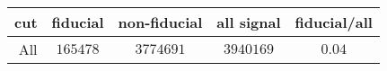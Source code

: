 \begin{tabular}{r|c|c|c|c}
cut&fiducial&non-fiducial&all signal&fiducial/all\\
\hline
All&$165478$&$3774691$&$3940169$&$0.04$\\
\end{tabular}

